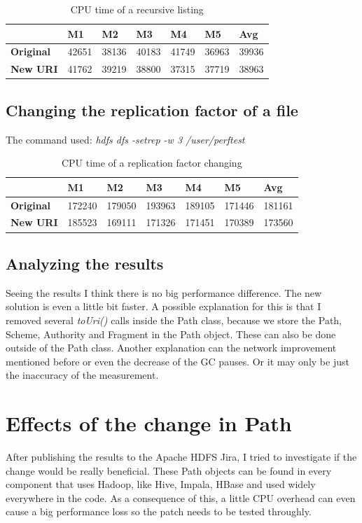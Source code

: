 \begin{table}[H]
	\begin{tabular}{|l|l|l|l|l|l|l|}
		\hline
		& \textbf{M1} & \textbf{M2} & \textbf{M3} & \textbf{M4} & \textbf{M5} & \textbf{Avg} \\ \hline
		\textbf{Original} & 42651    & 38136    & 40183    & 41749    & 36963    & 39936     \\ \hline
		\textbf{New URI}  & 41762    & 39219    & 38800    & 37315    & 37719    & 38963     \\ \hline
	\end{tabular}
\centering
\caption{CPU time of a recursive listing}
\end{table}
\subsection{Changing the replication factor of a file}
The command used:  \textit{hdfs dfs -setrep -w 3 /user/perftest}

\begin{table}[H]
	\begin{tabular}{|l|l|l|l|l|l|l|}
		\hline
		& \textbf{M1} & \textbf{M2} & \textbf{M3} & \textbf{M4} & \textbf{M5} & \textbf{Avg} \\ \hline
		\textbf{Original} & 172240      & 179050      & 193963      & 189105      & 171446      & 181161       \\ \hline
		\textbf{New URI}  & 185523      & 169111      & 171326      & 171451      & 170389      & 173560       \\ \hline
	\end{tabular}
\centering
\caption{CPU time of a replication factor changing}
\end{table}

\subsection{Analyzing the results}
Seeing the results I think there is no big performance difference. The new solution is even a little bit faster. A possible explanation for this is that I removed several \textit{toUri()} calls inside the Path class, because we store the Path, Scheme, Authority and Fragment in the Path object. These can also be done outside of the Path class. Another explanation can the network improvement mentioned before or even the decrease of the GC pauses. Or it may only be just the inaccuracy of the measurement.

\section{Effects of the change in Path}
After publishing the results to the Apache HDFS Jira, I tried to investigate if the change would be really beneficial. These Path objects can be found in every component that uses Hadoop, like Hive, Impala, HBase \etc and used widely everywhere in the code. As a consequence of this, a little CPU overhead can even cause a big performance loss so the patch needs to be tested throughly. 

